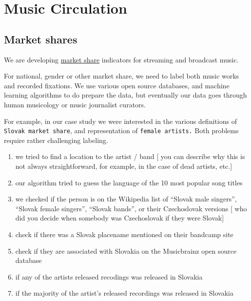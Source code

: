 \documentclass[
  a4paper,
  openany, a4paper, oneside]{book}
\providecommand{\tightlist}{%
  \setlength{\itemsep}{0pt}\setlength{\parskip}{0pt}}
\begin{document}
\hypertarget{music-circulation}{%
\section{Music Circulation}\label{music-circulation}}

\hypertarget{market-shares}{%
\subsection{Market shares}\label{market-shares}}

We are developing \href{https://data.music.dataobservatory.eu/music-diversity.html\#cross-border-circulation-of-works}{market share} indicators for streaming and broadcast music.

For national, gender or other market share, we need to label both music works and recorded fixations. We use various open source databases, and machine learning algorithms to do prepare the data, but eventually our data goes through human musicology or music journalist curators.

For example, in our case study we were interested in the various definitions of \texttt{Slovak\ market\ share}, and representation of \texttt{female\ artists.} Both problems require rather challenging labeling.

\begin{enumerate}
\def\labelenumi{\alph{enumi})}
\tightlist
\item
  we tried to find a location to the artist / band {[} you can describe why this is not always straightforward, for example, in the case of dead artists, etc.{]}
\item
  our algorithm tried to guess the language of the 10 most popular song titles
\item
  we checked if the person is on the Wikipedia list of ``Slovak male singers'', ``Slovak female singers'', ``Slovak bands'', or their Czechoslovak versions {[} who did you decide when somebody was Czechoslovak if they were Slovak{]}
\item
  check if there was a Slovak placename mentioned on their bandcamp site
\item
  check if they are associated with Slovakia on the Musicbrainz open source database
\item
  if any of the artists released recodings was released in Slovakia
\item
  if the majority of the artist's released recordings was released in Slovakia
\end{enumerate}
\end{document}
